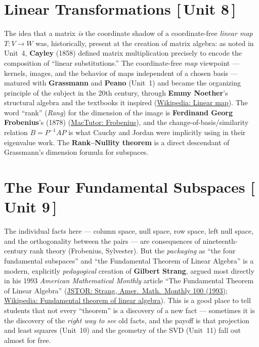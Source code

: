 \documentclass[11pt]{article}
\newcommand{\who}[1]{{\sffamily\bfseries #1}}
\newcommand{\yr}[1]{{\sffamily\color{BrickRed}(#1)}}
\newcommand{\unit}[1]{{\footnotesize\sffamily\color{RoyalBlue}[\,#1\,]}}
\begin{document}
\section{Linear Transformations \unit{Unit 8}}

The idea that a matrix \emph{is} the coordinate shadow of a coordinate-free
\emph{linear map} $T:V\to W$ was, historically, present at the creation of matrix
algebra: as noted in Unit~4, \who{Cayley} \yr{1858} defined matrix multiplication
precisely to encode the composition of ``linear substitutions.'' The
coordinate-free \emph{map} viewpoint --- kernels, images, and the behavior of maps
independent of a chosen basis --- matured with \who{Grassmann} and \who{Peano}
(Unit~1) and became the organizing principle of the subject in the 20th century,
through \who{Emmy Noether}'s structural algebra and the textbooks it inspired
(\href{https://en.wikipedia.org/wiki/Linear_map\#History}{Wikipedia: Linear map}).
The word ``rank'' (\emph{Rang}) for the dimension of the image is
\who{Ferdinand Georg Frobenius}'s \yr{1878}
(\href{https://mathshistory.st-andrews.ac.uk/Biographies/Frobenius/}{MacTutor:
Frobenius}), and the change-of-basis/similarity relation $B=P^{-1}AP$ is what
Cauchy and Jordan were implicitly using in their eigenvalue work. The
\who{Rank--Nullity theorem} is a direct descendant of Grassmann's dimension
formula for subspaces.

\section{The Four Fundamental Subspaces \unit{Unit 9}}

The individual facts here --- column space, null space, row space, left null
space, and the orthogonality between the pairs --- are consequences of
nineteenth-century rank theory (Frobenius, Sylvester). But the \emph{packaging} as
``the four fundamental subspaces'' and ``the Fundamental Theorem of Linear
Algebra'' is a modern, explicitly \emph{pedagogical} creation of \who{Gilbert
Strang}, argued most directly in his 1993 \emph{American Mathematical Monthly}
article ``The Fundamental Theorem of Linear Algebra''
(\href{https://www.jstor.org/stable/2324660}{JSTOR: Strang, Amer.\ Math.\ Monthly
100 (1993)}; \href{https://en.wikipedia.org/wiki/Fundamental_theorem_of_linear_algebra}{Wikipedia:
Fundamental theorem of linear algebra}). This is a good place to tell students
that not every ``theorem'' is a discovery of a new fact --- sometimes it is the
discovery of the \emph{right way to see} old facts, and the payoff is that
projection and least squares (Unit~10) and the geometry of the SVD (Unit~11) fall
out almost for free.
\end{document}
